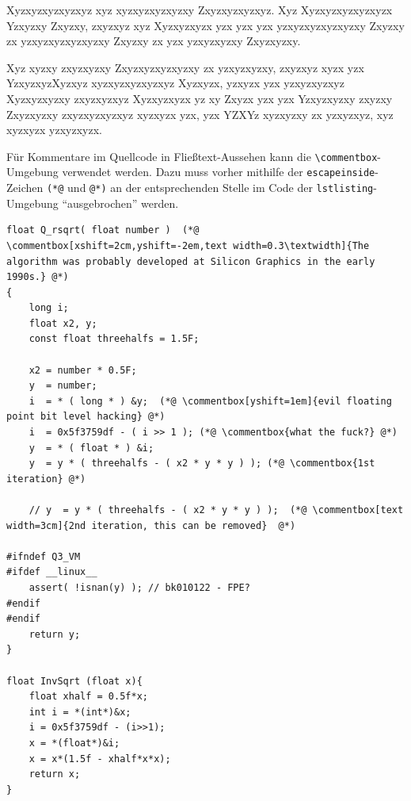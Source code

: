 Xyzxyzxyzxyzxyz xyz xyzxyzxyzxyzxy Zxyzxyzxyzxyz. Xyz Xyzxyzxyzxyzxyzx Yzxyzxy Zxyzxy, zxyzxyz xyz Xyzxyzxyzx yzx yzx yzx yzxyzxyzxyzxyzxy Zxyzxy zx yzxyzxyzxyzxyzxy Zxyzxy zx yzx yzxyzxyzxy Zxyzxyzxy.

Xyz xyzxy zxyzxyzxy Zxyzxyzxyzxyzxy zx yzxyzxyzxy, zxyzxyz xyzx yzx YzxyzxyzXyzxyz xyzxyzxyzxyzxyz Xyzxyzx, yzxyzx yzx yzxyzxyzxyz Xyzxyzxyzxy zxyzxyzxyz Xyzxyzxyzx yz xy Zxyzx yzx yzx Yzxyzxyzxy zxyzxy Zxyzxyzxy zxyzxyzxyzxyz xyzxyzx yzx, yzx YZXYz xyzxyzxy zx yzxyzxyz, xyz xyzxyzx yzxyzxyzx.

Für Kommentare im Quellcode in Fließtext-Aussehen kann die \verb|\commentbox|-Umgebung verwendet werden. Dazu muss vorher mithilfe der \verb|escapeinside|-Zeichen \verb|(*@| und \verb|@*)| an der entsprechenden Stelle im Code der \verb|lstlisting|-Umgebung \enquote{ausgebrochen} werden.

\lstset{language=C}
\begin{lstlisting}[caption={Fast inverse square root is a \code{method} of calculating the reciprocal (or multiplicative inverse) of a square root for a 32-bit floating point number in IEEE 754 floating point format. The algorithm was probably developed at Silicon Graphics in the early 1990s, and an implementation appeared in 1999 in the Quake III Arena source code, but the method did not appear on public forums such as Usenet until 2002 or 2003. At the time, the primary advantage of the algorithm came from avoiding computationally expensive floating point operations in favor of integer operations. Inverse square roots are used to compute angles of incidence and reflection for lighting and shading in computer graphics.}, label=code:two]
float Q_rsqrt( float number )  (*@ \commentbox[xshift=2cm,yshift=-2em,text width=0.3\textwidth]{The algorithm was probably developed at Silicon Graphics in the early 1990s.} @*)
{
	long i;
	float x2, y;
	const float threehalfs = 1.5F;
	
	x2 = number * 0.5F;
	y  = number;
	i  = * ( long * ) &y;  (*@ \commentbox[yshift=1em]{evil floating point bit level hacking} @*) 
	i  = 0x5f3759df - ( i >> 1 ); (*@ \commentbox{what the fuck?} @*)
	y  = * ( float * ) &i;
	y  = y * ( threehalfs - ( x2 * y * y ) ); (*@ \commentbox{1st iteration} @*)
	
	// y  = y * ( threehalfs - ( x2 * y * y ) );  (*@ \commentbox[text width=3cm]{2nd iteration, this can be removed}  @*)
	
#ifndef Q3_VM
#ifdef __linux__
	assert( !isnan(y) ); // bk010122 - FPE?
#endif
#endif
	return y;
}
	
float InvSqrt (float x){
	float xhalf = 0.5f*x;
	int i = *(int*)&x;
	i = 0x5f3759df - (i>>1);
	x = *(float*)&i;
	x = x*(1.5f - xhalf*x*x);
	return x;
}
\end{lstlisting}

